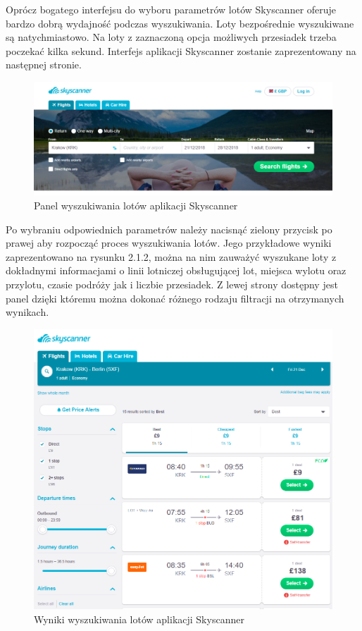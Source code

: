 \documentclass[12pt, twoside]{report}
\begin{document}
Oprócz bogatego interfejsu do wyboru parametrów lotów Skyscanner oferuje bardzo dobrą wydajność podczas wyszukiwania. Loty bezpośrednie wyszukiwane są natychmiastowo. Na loty z zaznaczoną opcja możliwych przesiadek trzeba poczekać kilka sekund. Interfejs aplikacji Skyscanner zostanie zaprezentowany na następnej stronie.
\newpage
\begin{figure}[!ht]
\centering
\includegraphics[scale=0.50, keepaspectratio]{skyscanner_main.png}
\caption{Panel wyszukiwania lotów aplikacji Skyscanner}
\label{fig:skyscanner_main}
\end{figure}
Po wybraniu odpowiednich parametrów należy nacisnąć zielony przycisk po prawej aby rozpocząć 
proces wyszukiwania lotów. Jego przykładowe wyniki zaprezentowano na rysunku 2.1.2, można na nim zauważyć wyszukane loty z dokładnymi informacjami o linii lotniczej obsługującej lot, miejsca wylotu oraz przylotu, czasie podróży jak i liczbie przesiadek. Z lewej strony dostępny jest panel dzięki któremu można dokonać różnego rodzaju filtracji na otrzymanych wynikach.
\begin{figure}[!ht]
\centering
\includegraphics[scale=0.45, keepaspectratio]{skyscanner_result.png}
\caption{Wyniki wyszukiwania lotów aplikacji Skyscanner}
\label{fig:skyscanner_result}
\end{figure}
\end{document}
